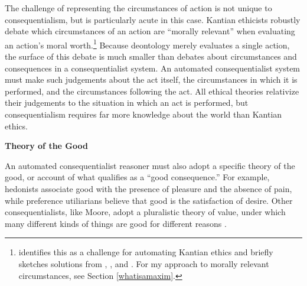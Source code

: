 \begin{isabellebody}
\begin{isamarkuptext}
The challenge of representing the circumstances of action is not unique to consequentialism, but is particularly acute in this case. 
Kantian ethicists robustly debate which circumstances of an action are ``morally relevant'' when evaluating an action's moral worth.\footnote{ 
\citet{powers} identifies this as a challenge for automating Kantian ethics and briefly sketches 
solutions from \citet{constofreason}, \citet{silber}, and \citet{rawlsconstructivism}. For my approach to
morally relevant circumstances, see Section \ref{whatisamaxim}.} Because deontology merely evaluates a 
single action, the surface of this debate is much smaller than debates about circumstances and 
consequences in a consequentialist system. An automated consequentialist system must make such 
judgements about the act itself, the circumstances in which it is performed, and the circumstances 
following the act. All ethical theories relativize their judgements to the situation in which an act 
is performed, but consequentialism requires far more knowledge about the world than Kantian ethics.%
\end{isamarkuptext}\isamarkuptrue%
%
\begin{isamarkuptext}%
\noindent \textbf{Theory of the Good}%
\end{isamarkuptext}\isamarkuptrue%
%
\begin{isamarkuptext}%
An automated consequentialist reasoner must also adopt a specific theory of the good, or account of 
what qualifies as a ``good consequence.'' For example, hedonists associate
good with the presence of pleasure and the absence of pain, while preference utiliarians believe that good is 
the satisfaction of desire. Other consequentialists, like Moore, adopt a pluralistic theory of value, under which 
many different kinds of things are good for different reasons \citep{moorepe}. 


\end{isamarkuptext}
\end{isabellebody}

